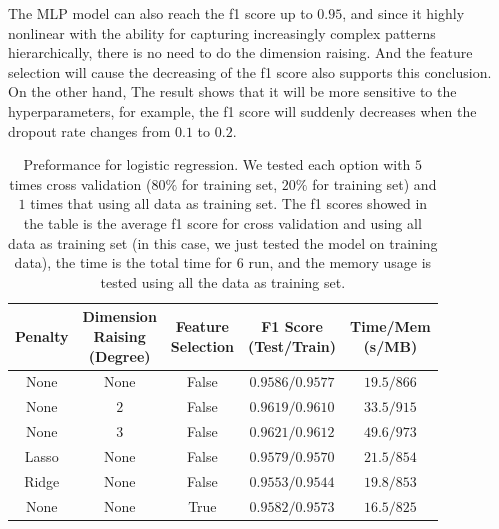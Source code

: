 \documentclass[11pt]{article}
\begin{document}
The MLP model can also reach the f1 score up to $0.95$, and since it highly nonlinear with the ability for capturing increasingly complex patterns hierarchically, there is no need to do the dimension raising. And the feature selection will cause the decreasing of the f1 score also supports this conclusion. On the other hand, The result shows that it will be more sensitive to the hyperparameters, for example, the f1 score will suddenly decreases when the dropout rate changes from $0.1$ to $0.2$.

\begin{table}[H]
  \centering
  \begin{tabular}{|c|c|c|c|c|}
    \hline
    Penalty & \makecell{Dimension                                        \\ Raising \\ (Degree)} & \makecell{Feature \\ Selection} & \makecell{F1 Score \\ (Test/Train)} & \makecell{Time/Mem \\ (s/MB)} \\
    \hline
    None    & None                & False & $0.9586/0.9577$ & $19.5/866$ \\
    \hline
    None    & $2$                 & False & $0.9619/0.9610$ & $33.5/915$ \\
    \hline
    None    & $3$                 & False & $0.9621/0.9612$ & $49.6/973$ \\
    \hline
    Lasso   & None                & False & $0.9579/0.9570$ & $21.5/854$ \\
    \hline
    Ridge   & None                & False & $0.9553/0.9544$ & $19.8/853$ \\
    \hline
    None    & None                & True  & $0.9582/0.9573$ & $16.5/825$ \\
    \hline
  \end{tabular}
  \caption{Preformance for logistic regression. We tested each option with $5$ times cross validation ($80\%$ for training set, $20\%$ for training set) and $1$ times that using all data as training set. The f1 scores showed in the table is the average f1 score for cross validation and using all data as training set (in this case, we just tested the model on training data), the time is the total time for $6$ run, and the memory usage is tested using all the data as training set.}
  \label{task-3-result-1}
\end{table}
\end{document}
